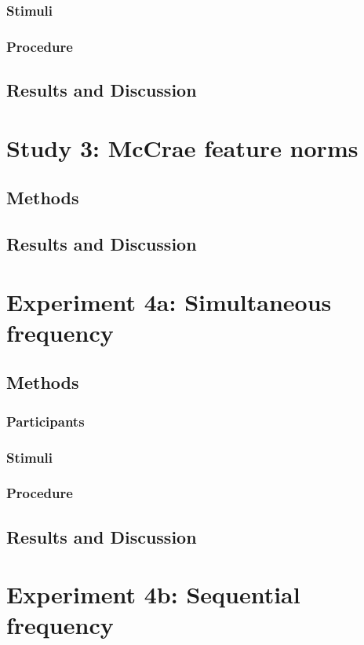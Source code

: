 \subsubsection{Stimuli} 
\subsubsection{Procedure}
\subsection{Results and Discussion}

\section{Study 3: McCrae feature norms }
\subsection{Methods}
\subsection{Results and Discussion}

\section{Experiment 4a: Simultaneous frequency}
\subsection{Methods}
\subsubsection{Participants} 
\subsubsection{Stimuli} 
\subsubsection{Procedure}
\subsection{Results and Discussion}

\section{Experiment 4b: Sequential frequency}
